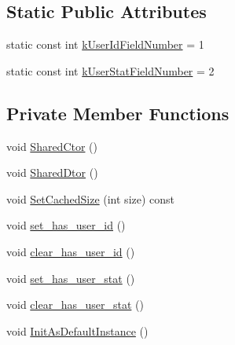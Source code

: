 \subsection*{Static Public Attributes}
\begin{DoxyCompactItemize}
\item 
static const int \hyperlink{class_i_m_1_1_base_define_1_1_client_user_stat_ae009e2460aada07658562462a364575d}{k\+User\+Id\+Field\+Number} = 1
\item 
static const int \hyperlink{class_i_m_1_1_base_define_1_1_client_user_stat_a69c758663ecebe87ec2050d741146706}{k\+User\+Stat\+Field\+Number} = 2
\end{DoxyCompactItemize}
\subsection*{Private Member Functions}
\begin{DoxyCompactItemize}
\item 
void \hyperlink{class_i_m_1_1_base_define_1_1_client_user_stat_a22756a4590a8206f21ba79a68ee4a0fa}{Shared\+Ctor} ()
\item 
void \hyperlink{class_i_m_1_1_base_define_1_1_client_user_stat_ae2803e3cefcc1eb491c534ff90342d72}{Shared\+Dtor} ()
\item 
void \hyperlink{class_i_m_1_1_base_define_1_1_client_user_stat_a0fee5df305a539467f9848b7549877e5}{Set\+Cached\+Size} (int size) const 
\item 
void \hyperlink{class_i_m_1_1_base_define_1_1_client_user_stat_ad8a590995160e928457e2c32a4910945}{set\+\_\+has\+\_\+user\+\_\+id} ()
\item 
void \hyperlink{class_i_m_1_1_base_define_1_1_client_user_stat_a674856ec387be402b9caa1873af33cd9}{clear\+\_\+has\+\_\+user\+\_\+id} ()
\item 
void \hyperlink{class_i_m_1_1_base_define_1_1_client_user_stat_ace7978f75e581722b180dadc9805e5e8}{set\+\_\+has\+\_\+user\+\_\+stat} ()
\item 
void \hyperlink{class_i_m_1_1_base_define_1_1_client_user_stat_a44b767a874a578d35e9be13c26342036}{clear\+\_\+has\+\_\+user\+\_\+stat} ()
\item 
void \hyperlink{class_i_m_1_1_base_define_1_1_client_user_stat_a25db70b1beed4e970e1e02e443263628}{Init\+As\+Default\+Instance} ()
\end{DoxyCompactItemize}
